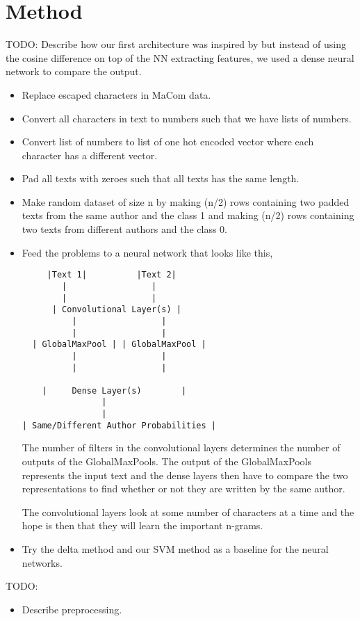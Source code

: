 \section{Method} \label{sec:method} 

TODO: Describe how our first architecture was inspired by \cite{qian:2018} but
instead of using the cosine difference on top of the NN extracting features, we
used a dense neural network to compare the output.

\begin{itemize}
    \item Replace escaped characters in MaCom data.
    \item Convert all characters in text to numbers such that we have lists of
        numbers.
    \item Convert list of numbers to list of one hot encoded vector where each
        character has a different vector.
    \item Pad all texts with zeroes such that all texts has the same length.
    \item Make random dataset of size n by making (n/2) rows containing two
        padded texts from the same author and the class 1 and making (n/2) rows
        containing two texts from different authors and the class 0.
    \item Feed the problems to a neural network that looks like this,

        \begin{lstlisting}
     |Text 1|          |Text 2|
        |                 |
        |                 |
      | Convolutional Layer(s) |
          |                 |
          |                 |
  | GlobalMaxPool | | GlobalMaxPool |
          |                 |
          |                 |

    |     Dense Layer(s)        |
                |
                |
| Same/Different Author Probabilities |
        \end{lstlisting}

        The number of filters in the convolutional layers determines the number
        of outputs of the GlobalMaxPools. The output of the GlobalMaxPools
        represents the input text and the dense layers then have to compare the
        two representations to find whether or not they are written by the same
        author.

        The convolutional layers look at some number of characters at a time and
        the hope is then that they will learn the important n-grams.

    \item Try the delta method and our SVM method as a baseline for the neural
        networks.

\end{itemize}

TODO:

\begin{itemize}
    \item Describe preprocessing.
\end{itemize}
